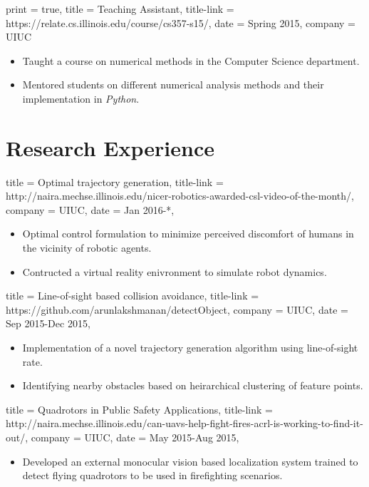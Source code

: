 \documentclass{simplecv}
\begin{document}
\begin{position}
  {
      print   = true,
      title   = Teaching Assistant,
      title-link = https://relate.cs.illinois.edu/course/cs357-s15/,
      date    = Spring 2015,
      company = UIUC
  }

  \begin{itemize}
      \item Taught a course on numerical methods in the Computer Science department.
      \item Mentored students on different numerical analysis methods and their implementation in \textit{Python}.
  \end{itemize}
\end{position}

\section{Research Experience}

\begin{position}
  {
      title   = Optimal trajectory generation,
      title-link = http://naira.mechse.illinois.edu/nicer-robotics-awarded-csl-video-of-the-month/,
      company = UIUC,
      date    = Jan 2016-*,
  }

  \begin{itemize}
      \item Optimal control formulation to minimize perceived discomfort of humans in the vicinity of robotic agents.

      \item Contructed a virtual reality enivronment to simulate robot dynamics.
\end{itemize}
\end{position}

\begin{position}
  {
      title   = Line-of-sight based collision avoidance,
      title-link = https://github.com/arunlakshmanan/detectObject,
      company = UIUC,
      date    = Sep 2015-Dec 2015,
  }

\begin{itemize}
    \item Implementation of a novel trajectory generation algorithm using line-of-sight rate.
    \item Identifying nearby obstacles based on heirarchical clustering of feature points.
\end{itemize}
\end{position}

\begin{position}
  {
      title   = Quadrotors in Public Safety Applications,
      title-link = http://naira.mechse.illinois.edu/can-uavs-help-fight-fires-acrl-is-working-to-find-it-out/,
      company = UIUC,
      date    = May 2015-Aug 2015,
  }

\begin{itemize}
    \item Developed an external monocular vision based localization system trained to detect flying quadrotors to be used in firefighting scenarios.
\end{itemize}
\end{position}
\end{document}
